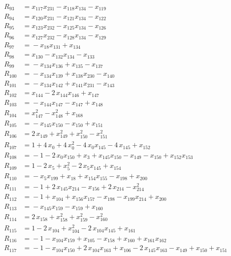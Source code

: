 \begin{align*}
R_{93} &={} x_{117} x_{231} -x_{118} x_{134} -x_{119} \\[2pt]
R_{94} &={} x_{120} x_{231} -x_{121} x_{134} -x_{122} \\[2pt]
R_{95} &={} x_{123} x_{232} -x_{125} x_{134} -x_{126} \\[2pt]
R_{96} &={} x_{127} x_{232} -x_{128} x_{134} -x_{129} \\[2pt]
R_{97} &={} -x_{18} x_{131} +x_{134} \\[2pt]
R_{98} &={} x_{130} -x_{132} x_{134} -x_{133} \\[2pt]
R_{99} &={} -x_{134} x_{136} +x_{135} -x_{137} \\[2pt]
R_{100} &={} -x_{134} x_{139} +x_{138} x_{230} -x_{140} \\[2pt]
R_{101} &={} -x_{134} x_{142} +x_{141} x_{231} -x_{143} \\[2pt]
R_{102} &={} x_{144} -2\,x_{144} x_{146} +x_{147} \\[2pt]
R_{103} &={} -x_{144} x_{147} -x_{147} +x_{148} \\[2pt]
R_{104} &={} x_{147}^{2} -x_{148}^{2} +x_{168} \\[2pt]
R_{105} &={} -x_{145} x_{150} -x_{150} +x_{151} \\[2pt]
R_{106} &={} 2\,x_{149} +x_{149}^{2} +x_{150}^{2} -x_{151}^{2} \\[2pt]
R_{107} &={} 1 +4\,x_{0} +4\,x_{0}^{2} -4\,x_{0} x_{145} -4\,x_{145} +x_{152} \\[2pt]
R_{108} &={} -1 -2\,x_{0} x_{150} +x_{3} +x_{145} x_{150} -x_{149} -x_{150} +x_{152} x_{153} \\[2pt]
R_{109} &={} 1 -2\,x_{5} +x_{5}^{2} -2\,x_{5} x_{145} +x_{154} \\[2pt]
R_{110} &={} -x_{5} x_{199} +x_{18} +x_{154} x_{155} -x_{198} +x_{200} \\[2pt]
R_{111} &={} -1 +2\,x_{145} x_{214} -x_{156} +2\,x_{214} -x_{214}^{2} \\[2pt]
R_{112} &={} -1 +x_{104} +x_{156} x_{157} -x_{198} -x_{199} x_{214} +x_{200} \\[2pt]
R_{113} &={} -x_{145} x_{159} -x_{159} +x_{160} \\[2pt]
R_{114} &={} 2\,x_{158} +x_{158}^{2} +x_{159}^{2} -x_{160}^{2} \\[2pt]
R_{115} &={} 1 -2\,x_{104} +x_{104}^{2} -2\,x_{104} x_{145} +x_{161} \\[2pt]
R_{116} &={} -1 -x_{104} x_{159} +x_{105} -x_{158} +x_{160} +x_{161} x_{162} \\[2pt]
R_{117} &={} -1 -x_{104} x_{150} +2\,x_{104} x_{163} +x_{106} -2\,x_{145} x_{163} -x_{149} +x_{150} +x_{151} \\

\end{align*}
